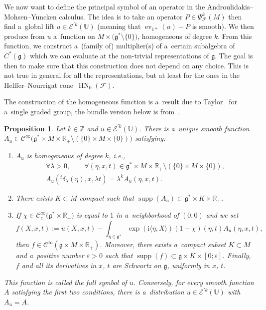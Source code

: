 \documentclass[pdftex]{sigma}
\newcommand{\tsp}[1]{{}^t \! #1} %
\newcommand{\ii}{\mathrm{i}} %
\newcommand{\supp}{\operatorname{supp}} %
\newcommand{\R}{\mathbb R} %
\newcommand{\Z}{\mathbb Z} %
\newcommand{\CCC}{\mathscr{C}} %
\newcommand{\g}{\mathfrak{g}} %
\newcommand{\lag}{\langle}
\newcommand{\rag}{\rangle}
\newcommand{\ev}{\operatorname{ev}} %
\newcommand{\HN}{\operatorname{HN}} %
\newcommand{\Fb}{\mathcal{F}} %
\newcommand{\U}{\mathbb U} %
\numberwithin{equation}{section}
\newtheorem{prop}[thm]{Proposition}
\theoremstyle{definition}
\begin{document}
We now want to define the principal symbol of an operator in the Androulidakis--Mohsen--Yuncken calculus. The idea is to take an operator $P \in \Psi^k_{\Fb}(M)$ then find a~global lift $u \in \mathcal{E}^{'k}(\U)$ (meaning that $\ev_{1*}(u)-P$ is smooth). We then produce from $u$ a~function on $M\times \bigl(\g^*\setminus \{0\}\bigr)$, homogeneous of degree $k$. From this function, we construct a~(family of) multiplier(s) of a~certain subalgebra of $C^*(\g)$ which we can evaluate at the non-trivial representations of $\g$.
The goal is then to make sure that this construction does not depend on any choice. This is not true in general for all the representations, but at least for the ones in the Helffer--Nourrigat cone~$\HN_0(\Fb)$.

The construction of the homogeneous function is a~result due to Taylor~\cite[Proposition 2.4]{Taylor} for a~single graded group, the bundle version below is from~\cite[Proposition 3.4]{AMYMaximalHypoellipticity}.

\begin{prop}
 Let $k\in \Z$ and $u \in \mathcal{E}^{'k}(\U)$. There is a~unique smooth function $A_u \in \CCC^{\infty}\bigl(\g^*\times M \times \R_+ \setminus (\{0\}\times M\times \{0\})\bigr)$ satisfying:
 \begin{enumerate}
\itemsep=0pt
 \item[$(1)$] $A_u$ is homogeneous of degree $k$, i.e.,
 \begin{gather*}
 \forall \lambda >0,\qquad \forall (\eta,x,t) \in \g^*\times M \times \R_+ \setminus (\{0\}\times M\times \{0\}),\\ A_u(\tsp\delta_{\lambda}(\eta),x,\lambda t) = \lambda^kA_u(\eta,x,t).
\end{gather*}
 \item[$(2)$] There exists $K\subset M$ compact such that $\supp(A_u) \subset \g^*\times K\times \R_+$.
 \item[$(3)$] If $\chi \in \CCC^{\infty}_c\bigl(\g^*\times \R_+\bigr)$ is equal to $1$ in a~neighborhood of $(0,0)$ and we set
 \[f(X,x,t) := u(X,x,t) - \int_{\eta\in\g^*}\exp(\ii \lag\eta,X\rag)(1-\chi)(\eta,t)A_u(\eta,x,t),\]
 then $f\in \CCC^{\infty}(\g\times M\times\R_+)$. Moreover, there exists a~compact subset $K \subset M$ and a~positive number $\varepsilon>0$ such that $\supp(f) \subset \g \times K \times [0;\varepsilon]$. Finally, $f$ and all its derivatives in $x$, $t$ are Schwartz on $\g$, uniformly in $x$, $t$.
 \end{enumerate}
 This function is called the full symbol of $u$. Conversely, for every smooth function $A$ satisfying the first two conditions, there is a~distribution $u\in\mathcal{E}^{'k}(\U)$ with $A_u = A$.
\end{prop}
\end{document}
